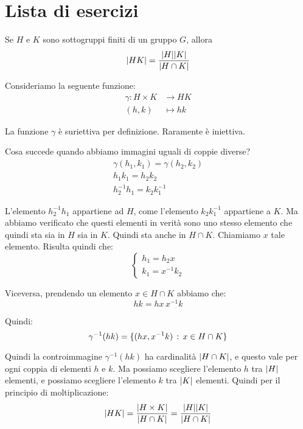 \chapter{Lista di esercizi}
\label{ch:lista_esercizi_!}

\begin{esercizio}
	\label{ex:ordine_HK}
	Se $H$ e $K$ sono sottogruppi finiti di un gruppo $G$, allora
	\begin{equation*}
		\lvert HK \rvert = \dfrac{\lvert H \rvert\lvert K \rvert}{\lvert H \cap K \rvert}
	\end{equation*}
\end{esercizio}
\begin{soluzione}
	Consideriamo la seguente funzione:
	\begin{align*}
		\gamma : H \times K &\longrightarrow HK \\
		(h, k) &\longmapsto hk
	\end{align*}

	La funzione $\gamma$ è suriettiva per definizione. Raramente è iniettiva.
	
	Cosa succede quando abbiamo immagini uguali di coppie diverse?
	\begin{gather*}
		\gamma(h_1, k_1) = \gamma(h_2, k_2) \\
		h_1k_1 = h_2k_2 \\
		h_2^{-1}h_1 = k_2k_1^{-1}
	\end{gather*}

	L'elemento $h_2^{-1}h_1$ appartiene ad $H$, come l'elemento $k_2k_1^{-1}$ appartiene a $K$.
	Ma abbiamo verificato che questi elementi in verità sono uno stesso elemento che quindi sta sia in $H$ sia in $K$.
	Quindi sta anche in $H \cap K$.
	Chiamiamo $x$ tale elemento.
	Risulta quindi che:
	\begin{equation*}
		\begin{cases}
			h_1 = h_2x \\
			k_1 = x^{-1}k_2
		\end{cases}
	\end{equation*}

	Viceversa, prendendo un elemento $x \in H \cap K$ abbiamo che:
	\begin{equation*}
		hk = hx \, x^{-1}k
	\end{equation*}

	Quindi:
	\begin{equation*}
		\gamma^{-1}(hk) = \{(hx, x^{-1}k) \,:\, x \in H \cap K\}
	\end{equation*}

	Quindi la controimmagine $\gamma^{-1}(hk)$ ha cardinalità $\lvert H \cap K \rvert$, e questo vale per ogni coppia di elementi $h$ e $k$.
	Ma possiamo scegliere l'elemento $h$ tra $\lvert H \rvert$ elementi, e possiamo scegliere l'elemento $k$ tra $\lvert K \rvert$ elementi.
	Quindi per il principio di moltiplicazione:
	\begin{equation*}
		\lvert HK \rvert = \dfrac{\lvert H \times K \rvert}{\lvert H \cap K \rvert} = \dfrac{\lvert H \rvert\lvert K \rvert}{\lvert H \cap K \rvert}
	\end{equation*}

\end{soluzione}

